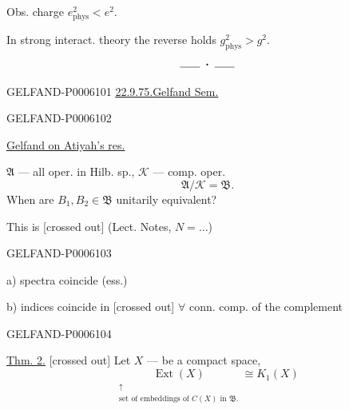 Obs. charge \(e_{\text{phys}}^2<e^2\).

In strong interact. theory the reverse holds \(g_{\text{phys}}^2>g^2\).
\[
\rule{1.8em}{.4pt}\;\boldsymbol{\cdot}\;\rule{1.8em}{.4pt}
\]


\begin{GelfandAdjacentEvidence}{GELFAND-P000610}{1}
\underline{\underline{22.9.75.}}\qquad\underline{Gelfand Sem.}

\end{GelfandAdjacentEvidence}
\begin{GelfandAdjacentEvidence}{GELFAND-P000610}{2}


\underline{Gelfand on Atiyah’s res.}

\(\mathfrak A\) — all oper. in Hilb. sp., \(\mathcal K\) — comp. oper.
\[
\mathfrak A/\mathcal K=\mathfrak B.
\]
When are \(B_1,B_2\in\mathfrak B\) unitarily equivalent?

This is [crossed out]  (Lect. Notes, \(N=\ldots\))
\end{GelfandAdjacentEvidence}
\begin{GelfandAdjacentEvidence}{GELFAND-P000610}{3}


a) spectra coincide (ess.)

b) indices coincide in [crossed out] \(\forall\) conn. comp. of the complement
\end{GelfandAdjacentEvidence}
\begin{GelfandAdjacentEvidence}{GELFAND-P000610}{4}


\underline{Thm. 2.} [crossed out] Let \(X\) — be a compact space,
\[
\underset{\substack{\uparrow\\\text{set of embeddings of }C(X)\text{ in }\mathfrak B.}}{\operatorname{Ext}(X)}\cong K_1(X)
\]
\end{GelfandAdjacentEvidence}
